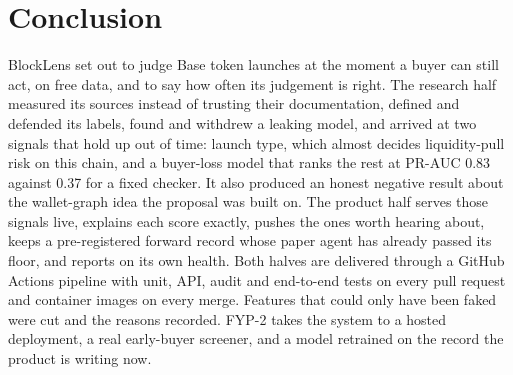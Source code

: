 \chapter{Conclusion}
BlockLens set out to judge Base token launches at the moment a buyer can still act, on free data, and to say how often its judgement is right. The research half measured its sources instead of trusting their documentation, defined and defended its labels, found and withdrew a leaking model, and arrived at two signals that hold up out of time: launch type, which almost decides liquidity-pull risk on this chain, and a buyer-loss model that ranks the rest at PR-AUC 0.83 against 0.37 for a fixed checker. It also produced an honest negative result about the wallet-graph idea the proposal was built on. The product half serves those signals live, explains each score exactly, pushes the ones worth hearing about, keeps a pre-registered forward record whose paper agent has already passed its floor, and reports on its own health. Both halves are delivered through a GitHub Actions pipeline with unit, API, audit and end-to-end tests on every pull request and container images on every merge. Features that could only have been faked were cut and the reasons recorded. FYP-2 takes the system to a hosted deployment, a real early-buyer screener, and a model retrained on the record the product is writing now.
